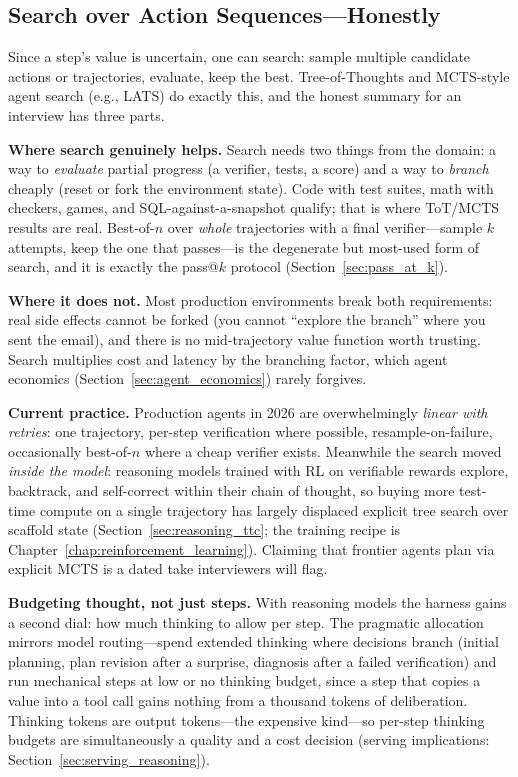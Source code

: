 \subsection{Search over Action Sequences---Honestly}

Since a step's value is uncertain, one can search: sample multiple candidate actions or trajectories, evaluate, keep the best. Tree-of-Thoughts and MCTS-style agent search (e.g., LATS) do exactly this, and the honest summary for an interview has three parts.

\textbf{Where search genuinely helps.} Search needs two things from the domain: a way to \textit{evaluate} partial progress (a verifier, tests, a score) and a way to \textit{branch} cheaply (reset or fork the environment state). Code with test suites, math with checkers, games, and SQL-against-a-snapshot qualify; that is where ToT/MCTS results are real. Best-of-$n$ over \textit{whole} trajectories with a final verifier---sample $k$ attempts, keep the one that passes---is the degenerate but most-used form of search, and it is exactly the pass@$k$ protocol (Section~\ref{sec:pass_at_k}).

\textbf{Where it does not.} Most production environments break both requirements: real side effects cannot be forked (you cannot ``explore the branch'' where you sent the email), and there is no mid-trajectory value function worth trusting. Search multiplies cost and latency by the branching factor, which agent economics (Section~\ref{sec:agent_economics}) rarely forgives.

\textbf{Current practice.} Production agents in 2026 are overwhelmingly \textit{linear with retries}: one trajectory, per-step verification where possible, resample-on-failure, occasionally best-of-$n$ where a cheap verifier exists. Meanwhile the search moved \textit{inside the model}: reasoning models trained with RL on verifiable rewards explore, backtrack, and self-correct within their chain of thought, so buying more test-time compute on a single trajectory has largely displaced explicit tree search over scaffold state (Section~\ref{sec:reasoning_ttc}; the training recipe is Chapter~\ref{chap:reinforcement_learning}). Claiming that frontier agents plan via explicit MCTS is a dated take interviewers will flag.

\textbf{Budgeting thought, not just steps.} With reasoning models the harness gains a second dial: how much thinking to allow per step. The pragmatic allocation mirrors model routing---spend extended thinking where decisions branch (initial planning, plan revision after a surprise, diagnosis after a failed verification) and run mechanical steps at low or no thinking budget, since a step that copies a value into a tool call gains nothing from a thousand tokens of deliberation. Thinking tokens are output tokens---the expensive kind---so per-step thinking budgets are simultaneously a quality and a cost decision (serving implications: Section~\ref{sec:serving_reasoning}).

